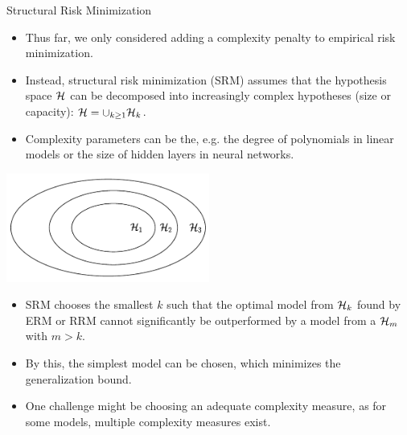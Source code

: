 \documentclass[11pt,compress,t,notes=noshow, xcolor=table]{beamer}
\begin{document}
\begin{vbframe} {Structural Risk Minimization}

\begin{itemize}
  \item Thus far, we only considered adding a complexity penalty to empirical risk minimization. 
  \item Instead,  structural risk minimization (SRM) assumes that the hypothesis space $\mathcal{H}$ can be decomposed into increasingly complex hypotheses (size or capacity): $\mathcal{H} = \cup_{k \geq 1 }\mathcal{H}_{k}$. 
  \item Complexity parameters can be the, e.g. the degree of polynomials in linear models or the size of hidden layers in neural networks.  
\end{itemize}

\begin{center}
\includegraphics[width=0.5\textwidth]{figure_man/fig-regu-srm-1}
\end{center}

\framebreak


\begin{itemize}

    \item SRM chooses the smallest $k$ such that the optimal model from $\mathcal{H}_k$ found by ERM or RRM cannot significantly
        be outperformed by a model from a $\mathcal{H}_m$ with $m > k$.
  \item By this, the simplest model can be chosen, which minimizes the generalization bound.  
  \item One challenge might be choosing an adequate complexity measure, as for some models, multiple complexity measures exist.
\end{itemize}


\end{vbframe}
\end{document}
